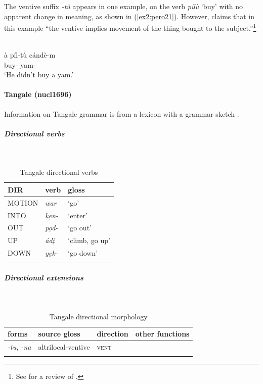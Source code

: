 The ventive suffix \textit{-tù} appears in one example,  on the verb \textit{pílù} `buy' with no apparent change in meaning, as shown in (\ref{ex2:pero21}). However, \citet[89]{frajzyngierLocativePredicationsChadic2024} claims that in this example ``the ventive implies movement of the thing bought to the subject.''\footnote{See \citet{lovestrandreview2025} for a review of \citet[]{frajzyngierLocativePredicationsChadic2024}.}

\ea\label{ex2:pero21}
 \\
\gll à píl-tù cándè-m	\\
 buy- yam- \\		
\glt `He didn't buy a yam.'
\z 

\paragraph*{Tangale (nucl1696)}  \label{tang}

Information on Tangale grammar is from a lexicon with a grammar sketch \citep{jungraithmayrDictionaryTangaleLanguage1991}. 

\newpage
\subparagraph{Directional verbs}~



\begin{table}[H]
	\caption{Tangale directional verbs} 
	\label{tab:tangV}
	\begin{tabular}{lll} %
		\lsptoprule
		DIR & verb & gloss   \\ %
		\midrule
		MOTION & \textit{war} & `go' \\
		INTO& \textit{kẹn-} & `enter' \\
		OUT & \textit{pọd-} & `go out' \\
		UP & \textit{ádị} & `climb, go up' \\
		DOWN & \textit{yẹk-} & `go down' \\
		\lspbottomrule
	\end{tabular}
\end{table}

\subparagraph{Directional extensions}~



\begin{table}[H]
	\caption{Tangale directional morphology}
	\label{tab:tang}
	\begin{tabular}{llll} %
		\lsptoprule
		forms & source gloss & direction  & other functions \\ %
		\midrule
		\textit{-tu, -na}  &  altrilocal-ventive  &  \textsc{vent}  &     \\
		\lspbottomrule
	\end{tabular}
\end{table} 

